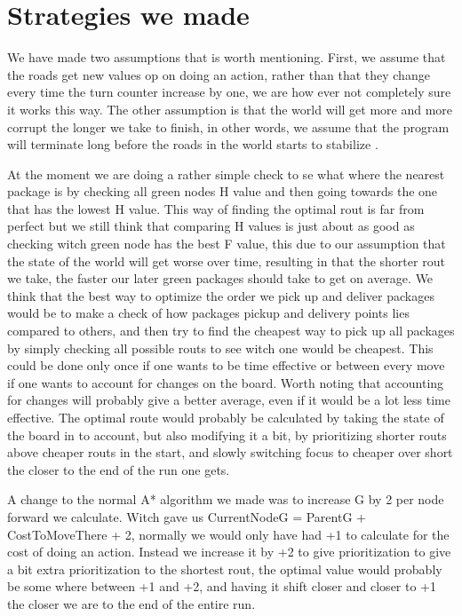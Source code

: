 \documentclass[12pt, a4paper]{article}
\begin{document}


\section{Strategies we made}
We have made two assumptions that is worth mentioning. First, we assume that the roads get new values op on doing an action, rather than that they change every time the turn counter increase by one, we are how ever not completely sure it works this way. The other assumption is that the world will get more and more corrupt the longer we take to finish, in other words, we assume that the program will terminate long before the roads in the world starts to stabilize  .

At the moment we are doing a rather simple check to se what where the nearest package is by checking all green nodes H value and then going towards the one that has the lowest H value. This way of finding the optimal rout is far from perfect but we still think that comparing H values is just about as good as checking witch green node has the best F value, this due to our assumption that the state of the world will get worse over time, resulting in that the shorter rout we take, the faster our later green packages should take to get on average.
We think that the best way to optimize the order we pick up and deliver packages would be to make a check of how packages pickup and delivery points lies compared to others, and then try to find the cheapest way to pick up all packages by simply checking all possible routs to see witch one would be cheapest. This could be done only once if one wants to be time effective or between every move if one wants to account for changes on the board. Worth noting that accounting for changes will probably give a better average, even if it would be a lot less time effective. The optimal route would probably be calculated by taking the state of the board in to account, but also modifying it a bit, by prioritizing shorter routs above cheaper routs in the start, and slowly switching focus to cheaper over short the closer to the end of the run one gets.

A change to the normal A* algorithm we made was to increase G by 2 per node forward we calculate. Witch gave us CurrentNodeG = ParentG + CostToMoveThere + 2, normally we would only have had +1 to calculate for the cost of doing an action. Instead we increase it by +2 to give prioritization to give a bit extra prioritization to the shortest rout, the optimal value would probably be some where between +1 and +2, and having it shift closer and closer to +1 the closer we are to the end of the entire run.
\end{document}
